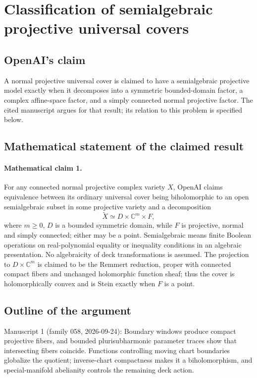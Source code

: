 \documentclass[11pt]{article}
\begin{document}
\section*{Classification of semialgebraic projective universal covers}

\subsection{OpenAI's claim}
A normal projective universal cover is claimed to have a semialgebraic projective model exactly when it decomposes into a symmetric bounded-domain factor, a complex affine-space factor, and a simply connected normal projective factor. The cited manuscript argues for that result; its relation to this problem is specified below.

\subsection{Mathematical statement of the claimed result}
\paragraph{Mathematical claim 1.} For any connected normal projective complex variety $X$, OpenAI claims equivalence between its ordinary universal cover being biholomorphic to an open semialgebraic subset in some projective variety and a decomposition
\[
\widetilde X\simeq D\times\mathbb C^m\times F,
\]
where $m\ge0$, $D$ is a bounded symmetric domain, while $F$ is projective, normal and simply connected; either may be a point. Semialgebraic means finite Boolean operations on real-polynomial equality or inequality conditions in an algebraic presentation. No algebraicity of deck transformations is assumed. The projection to $D\times\mathbb C^m$ is claimed to be the Remmert reduction, proper with connected compact fibers and unchanged holomorphic function sheaf; thus the cover is holomorphically convex and is Stein exactly when $F$ is a point.

\subsection{Outline of the argument}
Manuscript 1 (family 058, 2026-09-24): Boundary windows produce compact projective fibers, and bounded plurisubharmonic parameter traces show that intersecting fibers coincide. Functions controlling moving chart boundaries globalize the quotient; inverse-chart compactness makes it a biholomorphism, and special-manifold abelianity controls the remaining deck action.
\end{document}
